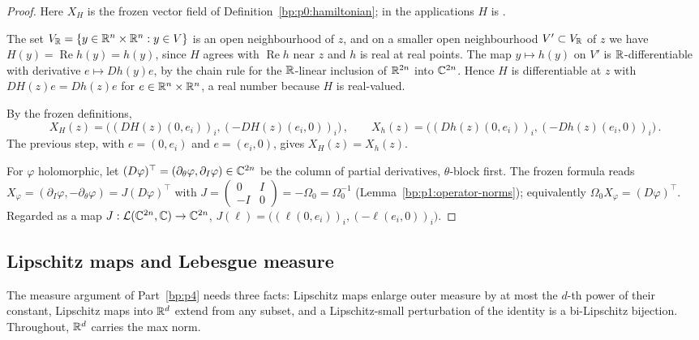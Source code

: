 \begin{proof}
Here $X_H$ is the frozen vector field of Definition~\ref{bp:p0:hamiltonian}; in the applications $H$ is
.

\label{step:p1:hr-derivative}
The set $V_{\mathbb{R}}=\{y\in\mathbb{R}^n\times\mathbb{R}^n:y\in V\}$ is an open neighbourhood of $z$, and on a smaller open
neighbourhood $V'\subset V_{\mathbb{R}}$ of $z$ we have $H(y)=\operatorname{Re}h(y)=h(y)$, since $H$ agrees with
$\operatorname{Re}h$ near $z$ and $h$ is real at real points. The map $y\mapsto h(y)$ on $V'$ is
$\mathbb{R}$-differentiable with derivative $e\mapsto Dh(y)e$, by the chain rule for the $\mathbb{R}$-linear inclusion of
$\mathbb{R}^{2n}$ into $\mathbb{C}^{2n}$. Hence $H$ is differentiable at $z$ with $DH(z)e=Dh(z)e$ for
$e\in\mathbb{R}^n\times\mathbb{R}^n$, a real number because $H$ is real-valued.

\label{step:p1:hr-components}
By the frozen definitions,
\begin{equation*}
X_H(z)=\bigl((DH(z)(0,e_i))_i,(-DH(z)(e_i,0))_i\bigr)\,,\qquad
X_h(z)=\bigl((Dh(z)(0,e_i))_i,(-Dh(z)(e_i,0))_i\bigr)\,.
\end{equation*}
The previous step, with $e=(0,e_i)$ and $e=(e_i,0)$, gives $X_H(z)=X_h(z)$.

\label{step:p1:hr-matrix}
For $\varphi$ holomorphic, let $(D\varphi)^\top=(\partial_\theta\varphi,\partial_I\varphi)\in\mathbb{C}^{2n}$ be the
column of partial derivatives, $\theta$-block first. The frozen formula reads
$X_\varphi=(\partial_I\varphi,-\partial_\theta\varphi)=J(D\varphi)^\top$ with
$J=\left(\begin{smallmatrix}0&I\\-I&0\end{smallmatrix}\right)=-\Omega_0=\Omega_0^{-1}$
(Lemma~\ref{bp:p1:operator-norms}); equivalently $\Omega_0X_\varphi=(D\varphi)^\top$. Regarded as a map
$J:\mathcal L(\mathbb{C}^{2n},\mathbb{C})\to\mathbb{C}^{2n}$, $J(\ell)=\bigl((\ell(0,e_i))_i,(-\ell(e_i,0))_i\bigr)$.
\end{proof}

\subsection{Lipschitz maps and Lebesgue measure}\label{bp:p1:sec-measure}

The measure argument of Part~\ref{bp:p4} needs three facts: Lipschitz maps enlarge outer measure by at
most the $d$-th power of their constant, Lipschitz maps into $\mathbb{R}^d$ extend from any subset, and a
Lipschitz-small perturbation of the identity is a bi-Lipschitz bijection. Throughout, $\mathbb{R}^d$ carries the
max norm.

